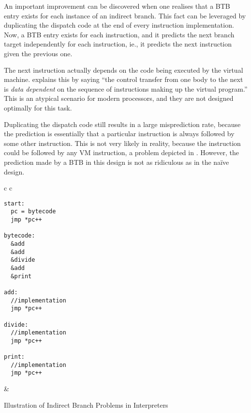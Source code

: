 		An important improvement can be discovered when one realises that a BTB entry exists for each instance of an indirect branch. This fact can be leveraged by duplicating the dispatch code at the end of every instruction implementation. Now, a BTB entry exists for each instruction, and it predicts the next branch target independently for each instruction, ie., it predicts the next instruction given the previous one.
		
		The next instruction actually depends on the code being executed by the virtual machine. \cite{yeti} explains this by saying ``the control transfer from one body to the next is \emph{data dependent} on the sequence of instructions making up the virtual program.'' This is an atypical scenario for modern processors, and they are not designed optimally for this task.
		
		Duplicating the dispatch code still results in a large misprediction rate, because the prediction is essentially that a particular instruction is always followed by some other instruction. This is not very likely in reality, because the instruction could be followed by any VM instruction, a problem depicted in . However, the prediction made by a BTB in this design is not as ridiculous as in the naïve design.
		
		\begin{myfigure}
			\begin{tabular}{c c}
				{
				\begin{lstlisting}
start:
  pc = bytecode
  jmp *pc++

bytecode:
  &add
  &add
  &divide
  &add
  &print

add:
  //implementation
  jmp *pc++

divide:
  //implementation
  jmp *pc++

print:
  //implementation
  jmp *pc++
				\end{lstlisting}
			} & 
			{
				\hspace{-9em}
			}
			\end{tabular}
			\caption{Illustration of Indirect Branch Problems in Interpreters}
			\label{fig:interpreterbtb}
		\end{myfigure}
		
